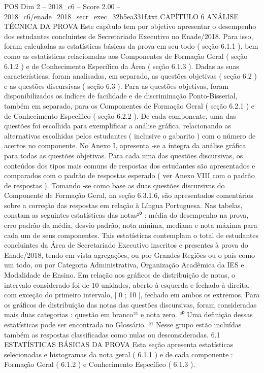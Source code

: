 \begin{textsample}{POS Dim 2 – 2018\_c6 – Score 2.00 – 2018\_c6/enade\_2018\_secr\_exec\_32b5ea331f.txt}  \label{ex:f2_pos_195}
CAPÍTULO 6 ANÁLISE TÉCNICA DA PROVA Este capítulo tem por objetivo apresentar o desempenho dos estudantes concluintes de Secretariado Executivo no Enade/2018.
Para isso, foram calculadas as estatísticas básicas da prova em seu todo ( seção 6.1.1 ), bem como as estatísticas relacionadas aos Componentes de Formação Geral ( seção 6.1.2 ) e de Conhecimento Específico da Área ( seção 6.1.3 ).
Dadas as suas características, foram analisadas, em separado, as questões objetivas ( seção 6.2 ) e as questões discursivas ( seção 6.3 ).
Para as questões objetivas, foram disponibilizados os índices de facilidade e de discriminação Ponto-Bisserial, também em separado, para os Componentes de Formação Geral ( seção 6.2.1 ) e de Conhecimento Específico ( seção 6.2.2 ).
De cada componente, uma das questões foi escolhida para exemplificar a análise gráfica, relacionando as alternativas escolhidas pelos estudantes ( inclusive o gabarito ) com o número de acertos no componente.
No Anexo I, apresenta -se a íntegra da análise gráfica para todas as questões objetivas.
Para cada uma das questões discursivas, os conteúdos dos tipos mais comuns de respostas dos estudantes são apresentados e comparados com o padrão de respostas esperado ( ver Anexo VIII com o padrão de respostas ).
Tomando -se como base as duas questões discursivas do Componente de Formação Geral, na seção 6.3.1.6, são apresentados comentários sobre a correção das respostas em relação à Língua Portuguesa.
Nas tabelas, constam as seguintes estatísticas das notas²⁰ : média do desempenho na prova, erro padrão da média, desvio padrão, nota mínima, mediana e nota máxima para cada um de seus componentes.
Tais estatísticas contemplam o total de estudantes concluintes da Área de Secretariado Executivo inscritos e presentes à prova do Enade/2018, tendo em vista agregações, ou por Grandes Regiões ou o país como um todo, ou por Categoria Administrativa, Organização Acadêmica da IES e Modalidade de Ensino.
Em relação aos gráficos de distribuição de notas, o intervalo considerado foi de 10 unidades, aberto à esquerda e fechado à direita, com exceção do primeiro intervalo, [ 0 ; 10 ], fechado em ambos os extremos.
Para os gráficos de distribuição das notas das questões discursivas, foram consideradas mais duas categorias : questão em branco²¹ e nota zero. ²⁰ Uma definição dessas estatísticas pode ser encontrada no Glossário. ²¹ Nesse grupo estão incluídas também as respostas classificadas como nulas ou desconsideradas. 6.1 ESTATÍSTICAS BÁSICAS DA PROVA Esta seção apresenta estatísticas selecionadas e histogramas da nota geral ( 6.1.1 ) e de cada componente : Formação Geral ( 6.1.2 ) e Conhecimento Específico ( 6.1.3 ).

\end{textsample}
